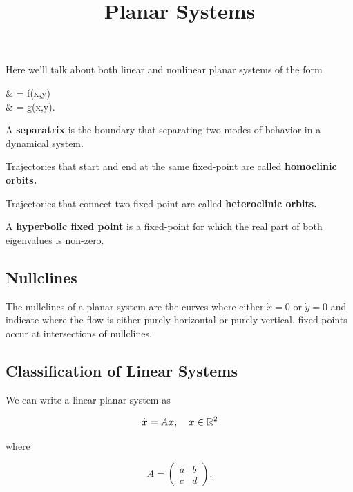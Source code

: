 \documentclass{article}
\title{Planar Systems}
\begin{document}
Here we'll talk about both linear and nonlinear planar systems of the form

\bal
{} & = f(x,y) \\
 & = g(x,y).
\eal

\begin{definition}[Separatrix]
A \textbf{separatrix} is the boundary that separating two modes of behavior in a dynamical system.
\end{definition}

\begin{definition}
\@{Trajectories} that start and end at the same \@{fixed-point} are called \textbf{homoclinic orbits.}
\end{definition}

\begin{definition}
\@{Trajectories} that connect two \@{fixed-point} are called \textbf{heteroclinic orbits.}
\end{definition}

\begin{definition}
A \textbf{hyperbolic fixed point} is a \@{fixed-point} for which the real part of both eigenvalues is non-zero.
\end{definition}

\subsection{Nullclines}

\begin{definition}[Nullcline]
The nullclines of a planar system are the curves where either $\dot{x} = 0$ or $\dot{y} = 0$ and indicate where the flow is either purely horizontal or purely vertical. \@{fixed-points} occur at intersections of nullclines.
\end{definition}

\subsection{Classification of Linear Systems}

We can write a linear planar system as

\[ \dot{\boldsymbol{x}} = A \boldsymbol{x}, \quad \boldsymbol{x} \in \mathbb{R}^2 \]

where

\[ A = \begin{pmatrix} a & b \\ c & d \end{pmatrix}. \]
\end{document}
